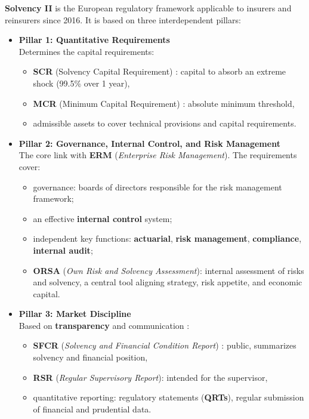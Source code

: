 	
\begin{f}
	
	\textbf{Solvency II} is the European regulatory framework applicable to insurers and reinsurers since 2016. It is based on three interdependent pillars:
	
	\begin{itemize}
		\item \textbf{Pillar 1: Quantitative Requirements} \\
		Determines the capital requirements:
		\begin{itemize}
			\item \textbf{SCR} (Solvency Capital Requirement) : capital to absorb an extreme shock (99.5\% over 1 year),
			\item \textbf{MCR} (Minimum Capital Requirement) : absolute minimum threshold,
			\item admissible assets to cover technical provisions and capital requirements.
		\end{itemize}
		
		\item \textbf{Pillar 2: Governance, Internal Control, and Risk Management} \\
		The core link with \textbf{ERM} (\emph{Enterprise Risk Management}). The requirements cover:
		\begin{itemize}
			\item governance: boards of directors responsible for the risk management framework;
			\item an effective \textbf{internal control} system;
			\item independent key functions: \textbf{actuarial}, \textbf{risk management}, \textbf{compliance}, \textbf{internal audit};
			\item \textbf{ORSA} (\emph{Own Risk and Solvency Assessment}): internal assessment of risks and solvency, a central tool aligning strategy, risk appetite, and economic capital.
		\end{itemize}
		
		\item \textbf{Pillar 3: Market Discipline} \\
		Based on \textbf{transparency} and communication :
		\begin{itemize}
			\item \textbf{SFCR} (\emph{Solvency and Financial Condition Report}) : public, summarizes solvency and financial position,
			\item \textbf{RSR} (\emph{Regular Supervisory Report}): intended for the supervisor,
			\item quantitative reporting: regulatory statements (\textbf{QRTs}), regular submission of financial and prudential data.
		\end{itemize}
	\end{itemize}
		
\end{f}
